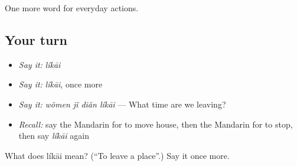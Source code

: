 \begin{grammarlens}[title={What you've built}]
One more word for everyday actions.
\end{grammarlens}

\subsection*{Your turn}
\begin{itemize}
\raggedright
  \item \emph{Say it:} \emph{líkāi}
  \item \emph{Say it:} \emph{líkāi}, once more
  \item \emph{Say it:} \emph{wǒmen jǐ diǎn líkāi} — What time are we leaving?
  \item \emph{Recall:} say the Mandarin for to move house, then the Mandarin for to stop, then say \emph{líkāi} again
\end{itemize}

\begin{tcolorbox}[breakable,colback=teal!4,colframe=teal!35!black,title={Before you move on}]
What does líkāi mean? (\textquotedblleft{}To leave a place\textquotedblright{}.) Say it once more.
\end{tcolorbox}
